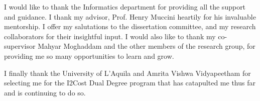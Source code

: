 I would like to thank the Informatics department for providing all the support and guidance. I thank my advisor, Prof. Henry Muccini heartily for his invaluable mentorship. I offer my salutations to the dissertation committee, and my research collaborators for their insightful input. I would also like to thank my co-supervisor Mahyar Moghaddam and the other members of the research group, for providing me so many opportunities to learn and grow. 

I finally thank the University of L'Aquila and Amrita Vishwa Vidyapeetham for selecting me for the I2Cost Dual Degree program that has catapulted me thus far and is continuing to do so. 